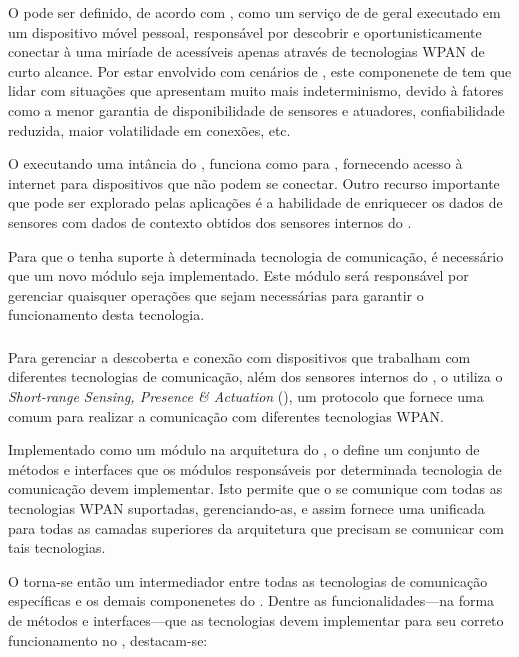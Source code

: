 O \middleware \mhub pode ser definido, de acordo com , como um serviço de \middleware de \iomt geral executado em um dispositivo móvel pessoal, responsável por descobrir e oportunisticamente conectar à uma miríade de \smartobjs acessíveis apenas através de tecnologias WPAN de curto alcance. Por estar envolvido com cenários de \iomt, este componenete de \software tem que lidar com situações que apresentam muito mais indeterminismo, devido à fatores como a menor garantia de disponibilidade de sensores e atuadores, confiabilidade reduzida, maior volatilidade em conexões, etc.

O \smartphone executando uma intância do \mhub, funciona como \gateway para \smartobjs, fornecendo acesso à internet para dispositivos que não podem se conectar. Outro recurso importante que pode ser explorado pelas aplicações é a habilidade de enriquecer os dados de sensores com dados de contexto obtidos dos sensores internos do \mhub.

Para que o \mhub tenha suporte à determinada tecnologia de comunicação, é necessário que um novo módulo seja implementado. Este módulo será responsável por gerenciar quaisquer operações que sejam necessárias para garantir o funcionamento desta tecnologia.

\subsubsection{\stwopa}

Para gerenciar a descoberta e conexão com dispositivos que trabalham com diferentes tecnologias de comunicação, além dos sensores internos do \smartphone, o \mhub utiliza o \textit{Short-range Sensing, Presence \& Actuation} (\stwopa), um protocolo que fornece uma \api comum para realizar a comunicação com diferentes tecnologias WPAN.

Implementado como um módulo na arquitetura do \middleware, o \stwopa define um conjunto de métodos e interfaces que os módulos responsáveis por determinada tecnologia de comunicação devem implementar. Isto permite que o \stwopa se comunique com todas as tecnologias WPAN suportadas, gerenciando-as, e assim fornece uma \api unificada para todas as camadas superiores da arquitetura que precisam se comunicar com tais tecnologias.

O \stwopa torna-se então um intermediador entre todas as tecnologias de comunicação específicas e os demais componenetes do \middleware. Dentre as funcionalidades---na forma de métodos e interfaces---que as tecnologias devem implementar para seu correto funcionamento no \middleware, destacam-se:

